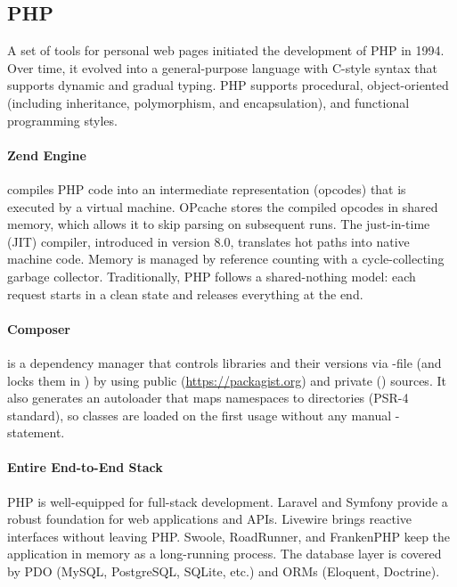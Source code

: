 
\subsection{PHP}
 \label{php}

A set of tools for personal web pages initiated the development of PHP in 1994. Over time, it
evolved into a general-purpose language with C-style syntax that supports dynamic and gradual
typing. PHP supports procedural, object-oriented (including inheritance, polymorphism, and
encapsulation), and functional programming styles.

\paragraph{Zend Engine} compiles PHP code into an intermediate representation (opcodes) that is
executed by a virtual machine. OPcache stores the compiled opcodes in shared memory, which
allows it to skip parsing on subsequent runs. The just-in-time (JIT) compiler, introduced in
version 8.0, translates hot paths into native machine code. Memory is managed by reference
counting with a cycle-collecting garbage collector. Traditionally, PHP follows a shared-nothing
model: each request starts in a clean state and releases everything at the end.

\paragraph{Composer} is a dependency manager that controls libraries and their versions via
-file (and locks them in ) by using public
(\href{https://packagist.org}{https://packagist.org}) and private
() sources. It also generates an
autoloader that maps namespaces to directories (PSR-4 standard), so classes are loaded on the
first usage without any manual -statement.

\paragraph{Entire End-to-End Stack} PHP is well-equipped for full-stack development. Laravel and
Symfony provide a robust foundation for web applications and APIs. Livewire brings reactive
interfaces without leaving PHP. Swoole, RoadRunner, and FrankenPHP keep the application in
memory as a long-running process. The database layer is covered by PDO (MySQL, PostgreSQL,
SQLite, etc.) and ORMs (Eloquent, Doctrine).


